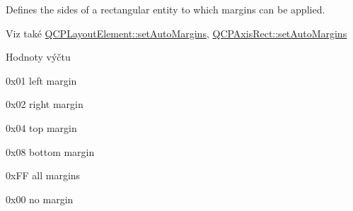 Defines the sides of a rectangular entity to which margins can be applied. 

\begin{DoxySeeAlso}{Viz také}
\hyperlink{classQCPLayoutElement_accfda49994e3e6d51ed14504abf9d27d}{Q\+C\+P\+Layout\+Element\+::set\+Auto\+Margins}, \hyperlink{classQCPLayoutElement_accfda49994e3e6d51ed14504abf9d27d}{Q\+C\+P\+Axis\+Rect\+::set\+Auto\+Margins} 
\end{DoxySeeAlso}
\begin{Desc}
\item[Hodnoty výčtu]\par
\begin{description}
\item[{\em 
\hypertarget{namespaceQCP_a7e487e3e2ccb62ab7771065bab7cae54a9500c8bfcc9e80b9dff0a8e00e867f07}{}ms\+Left\label{namespaceQCP_a7e487e3e2ccb62ab7771065bab7cae54a9500c8bfcc9e80b9dff0a8e00e867f07}
}]{\ttfamily 0x01} left margin \item[{\em 
\hypertarget{namespaceQCP_a7e487e3e2ccb62ab7771065bab7cae54a93c719593bb2b94ed244d52c86d83b65}{}ms\+Right\label{namespaceQCP_a7e487e3e2ccb62ab7771065bab7cae54a93c719593bb2b94ed244d52c86d83b65}
}]{\ttfamily 0x02} right margin \item[{\em 
\hypertarget{namespaceQCP_a7e487e3e2ccb62ab7771065bab7cae54a5db8fb0d0b0ecf0d611c2602a348e8a0}{}ms\+Top\label{namespaceQCP_a7e487e3e2ccb62ab7771065bab7cae54a5db8fb0d0b0ecf0d611c2602a348e8a0}
}]{\ttfamily 0x04} top margin \item[{\em 
\hypertarget{namespaceQCP_a7e487e3e2ccb62ab7771065bab7cae54a5241d8eac2bab9524a38889f576179cc}{}ms\+Bottom\label{namespaceQCP_a7e487e3e2ccb62ab7771065bab7cae54a5241d8eac2bab9524a38889f576179cc}
}]{\ttfamily 0x08} bottom margin \item[{\em 
\hypertarget{namespaceQCP_a7e487e3e2ccb62ab7771065bab7cae54a43d7361cb0c5244eabdc962021bffebc}{}ms\+All\label{namespaceQCP_a7e487e3e2ccb62ab7771065bab7cae54a43d7361cb0c5244eabdc962021bffebc}
}]{\ttfamily 0x\+F\+F} all margins \item[{\em 
\hypertarget{namespaceQCP_a7e487e3e2ccb62ab7771065bab7cae54a80aa4149f16dabd538f8b2e3d42c42d5}{}ms\+None\label{namespaceQCP_a7e487e3e2ccb62ab7771065bab7cae54a80aa4149f16dabd538f8b2e3d42c42d5}
}]{\ttfamily 0x00} no margin \end{description}
\end{Desc}
\hypertarget{namespaceQCP_a5400e5fcb9528d92002ddb938c1f4ef4}{}
